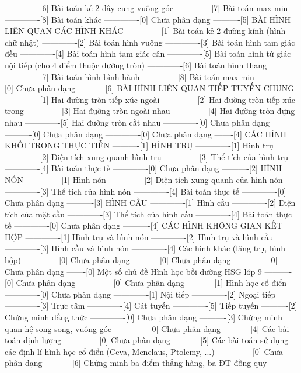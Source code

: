 -------------[6] Bài toán kẻ 2 dây cung vuông góc
-------------[7] Bài toán max-min
-------------[8] Bài toán khác
-------------[0] Chưa phân dạng
----------[5] BÀI HÌNH LIÊN QUAN CÁC HÌNH KHÁC
-------------[1] Bài toán kẻ 2 đường kính (hình chữ nhật)
-------------[2] Bài toán hình vuông
-------------[3] Bài toán hình tam giác đều
-------------[4] Bài toán hình tam giác cân
-------------[5] Bài toán hình tứ giác nội tiếp (cho 4 điểm thuộc đường tròn)
-------------[6] Bài toán hình thang
-------------[7] Bài toán hình bình hành
-------------[8] Bài toán max-min
-------------[0] Chưa phân dạng
----------[6] BÀI HÌNH LIÊN QUAN TIẾP TUYẾN CHUNG
-------------[1] Hai đường tròn tiếp xúc ngoài
-------------[2] Hai đường tròn tiếp xúc trong
-------------[3] Hai đường tròn ngoài nhau
-------------[4] Hai đường tròn đựng nhau
-------------[5] Hai đường tròn cắt nhau
-------------[0] Chưa phân dạng
----------[0] Chưa phân dạng
-------------[0] Chưa phân dạng
-------[4] CÁC HÌNH KHỐI TRONG THỰC TIỄN
----------[1] HÌNH TRỤ
-------------[1] Hình trụ
-------------[2] Diện tích xung quanh hình trụ
-------------[3] Thể tích của hình trụ
-------------[4] Bài toán thực tế
-------------[0] Chưa phân dạng
----------[2] HÌNH NÓN
-------------[1] Hình nón
-------------[2] Diện tích xung quanh của hình nón
-------------[3] Thể tích của hình nón
-------------[4] Bài toán thực tế
-------------[0] Chưa phân dạng
----------[3] HÌNH CẦU
-------------[1] Hình cầu
-------------[2] Diện tích của mặt cầu
-------------[3] Thể tích của hình cầu
-------------[4] Bài toán thực tế
-------------[0] Chưa phân dạng
----------[4] CÁC HÌNH KHÔNG GIAN KẾT HỢP
-------------[1] Hình trụ và hình nón
-------------[2] Hình trụ và hình cầu
-------------[3] Hình cầu và hình nón
-------------[4] Các hình khác (lăng trụ, hình hộp)
-------------[0] Chưa phân dạng
----------[0] Chưa phân dạng
-------------[0] Chưa phân dạng
-------[0] Một số chủ đề Hình học bồi dưỡng HSG lớp 9
----------[0] Chưa phân dạng
-------------[0] Chưa phân dạng
----------[1] Hình học cổ điển
-------------[0] Chưa phân dạng
-------------[1] Nội tiếp
-------------[2] Ngoại tiếp
-------------[3] Trực tâm
-------------[4] Cát tuyến
-------------[5] Tiếp tuyến
----------[2] Chứng minh đẳng thức
-------------[0] Chưa phân dạng
----------[3] Chứng minh quan hệ song song, vuông góc
-------------[0] Chưa phân dạng
----------[4] Các bài toán định lượng
-------------[0] Chưa phân dạng
----------[5] Các bài toán sử dụng các định lí hình học cổ điển (Ceva, Menelaus, Ptolemy, ...)
-------------[0] Chưa phân dạng
----------[6] Chứng minh ba điểm thẳng hàng, ba ĐT đồng quy

